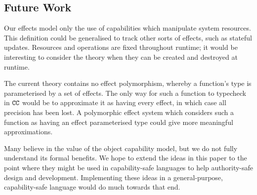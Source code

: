 \subsection{Future Work}

Our effects model only the use of capabilities which manipulate system resources. This definition could be generalised to track other sorts of effects, such as stateful updates. Resources and operations are fixed throughout runtime; it would be interesting to consider the theory when they can be created and destroyed at runtime.

The current theory contains no effect polymorphism, whereby a function's type is parameterised by a set of effects. The only way for such a function to typecheck in $\mathtt{CC}$ would be to approximate it as having every effect, in which case all precision has been lost. A polymorphic effect system which considers such a function as having an effect parameterised type could give more meaningful approximations.

Many believe in the value of the object capability model, but we do not fully understand its formal benefits. We hope to extend the ideas in this paper to the point where they might be used in capability-safe languages to help authority-safe design and development. Implementing these ideas in a general-purpose, capability-safe language would do much towards that end.

